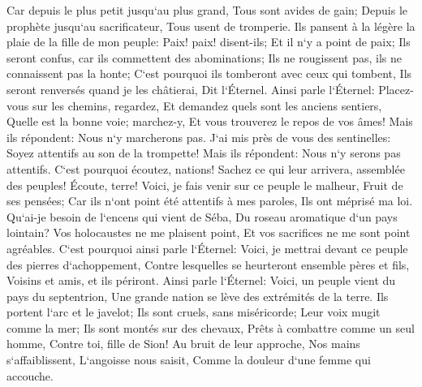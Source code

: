 \verse Car depuis le plus petit jusqu`au plus grand, Tous sont avides de gain; Depuis le prophète jusqu`au sacrificateur, Tous usent de tromperie. 
\verse Ils pansent à la légère la plaie de la fille de mon peuple: Paix! paix! disent-ils; Et il n`y a point de paix; 
\verse Ils seront confus, car ils commettent des abominations; Ils ne rougissent pas, ils ne connaissent pas la honte; C`est pourquoi ils tomberont avec ceux qui tombent, Ils seront renversés quand je les châtierai, Dit l`Éternel. 
\verse Ainsi parle l`Éternel: Placez-vous sur les chemins, regardez, Et demandez quels sont les anciens sentiers, Quelle est la bonne voie; marchez-y, Et vous trouverez le repos de vos âmes! Mais ils répondent: Nous n`y marcherons pas. 
\verse J`ai mis près de vous des sentinelles: Soyez attentifs au son de la trompette! Mais ils répondent: Nous n`y serons pas attentifs. 
\verse C`est pourquoi écoutez, nations! Sachez ce qui leur arrivera, assemblée des peuples! 
\verse Écoute, terre! Voici, je fais venir sur ce peuple le malheur, Fruit de ses pensées; Car ils n`ont point été attentifs à mes paroles, Ils ont méprisé ma loi. 
\verse Qu`ai-je besoin de l`encens qui vient de Séba, Du roseau aromatique d`un pays lointain? Vos holocaustes ne me plaisent point, Et vos sacrifices ne me sont point agréables. 
\verse C`est pourquoi ainsi parle l`Éternel: Voici, je mettrai devant ce peuple des pierres d`achoppement, Contre lesquelles se heurteront ensemble pères et fils, Voisins et amis, et ils périront. 
\verse Ainsi parle l`Éternel: Voici, un peuple vient du pays du septentrion, Une grande nation se lève des extrémités de la terre. 
\verse Ils portent l`arc et le javelot; Ils sont cruels, sans miséricorde; Leur voix mugit comme la mer; Ils sont montés sur des chevaux, Prêts à combattre comme un seul homme, Contre toi, fille de Sion! 
\verse Au bruit de leur approche, Nos mains s`affaiblissent, L`angoisse nous saisit, Comme la douleur d`une femme qui accouche. 
